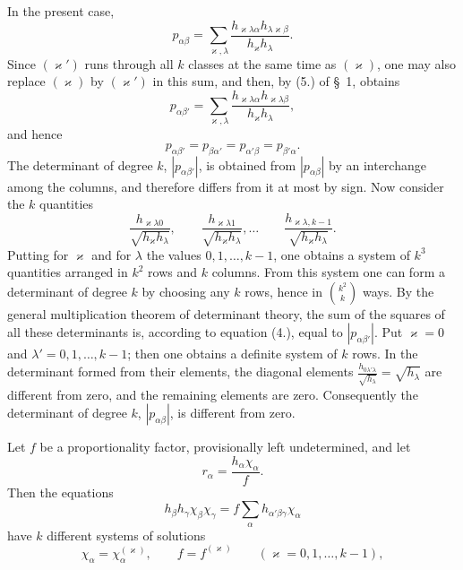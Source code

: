 \documentclass[11pt]{article}
\begin{document}
In the present case,
\[
p_{\alpha\beta}=\sum_{\varkappa,\lambda}\frac{h_{\varkappa\lambda\alpha}h_{\lambda\varkappa\beta}}{h_\varkappa h_\lambda}.
\]
Since $(\varkappa')$ runs through all $k$ classes at the same time as $(\varkappa)$, one may also replace $(\varkappa)$ by $(\varkappa')$ in this sum, and then, by (5.) of \S~1, obtains
\begin{equation*}\tag{4.}
p_{\alpha\beta'}=\sum_{\varkappa,\lambda}\frac{h_{\varkappa\lambda\alpha}h_{\varkappa\lambda\beta}}{h_\varkappa h_\lambda},
\end{equation*}
and hence
\begin{equation*}\tag{5.}
p_{\alpha\beta'}=p_{\beta\alpha'}=p_{\alpha'\beta}=p_{\beta'\alpha}.
\end{equation*}
The determinant of degree $k$, $|p_{\alpha\beta'}|$, is obtained from $|p_{\alpha\beta}|$ by an interchange among the columns, and therefore differs from it at most by sign. Now consider the $k$ quantities
\[
\frac{h_{\varkappa\lambda0}}{\sqrt{h_\varkappa h_\lambda}},\qquad
\frac{h_{\varkappa\lambda1}}{\sqrt{h_\varkappa h_\lambda}},\ldots\qquad
\frac{h_{\varkappa\lambda,k-1}}{\sqrt{h_\varkappa h_\lambda}}.
\]
Putting for $\varkappa$ and for $\lambda$ the values $0,1,\ldots,k-1$, one obtains a system of $k^3$ quantities arranged in $k^2$ rows and $k$ columns. From this system one can form a determinant of degree $k$ by choosing any $k$ rows, hence in $\binom{k^2}{k}$ ways. By the general multiplication theorem of determinant theory, the sum of the squares of all these determinants is, according to equation (4.), equal to $|p_{\alpha\beta'}|$. Put $\varkappa=0$ and $\lambda'=0,1,\ldots,k-1$; then one obtains a definite system of $k$ rows. In the determinant formed from their elements, the diagonal elements $\frac{h_{0\lambda'\lambda}}{\sqrt{h_\lambda}}=\sqrt{h_\lambda}$ are different from zero, and the remaining elements are zero. Consequently the determinant of degree $k$, $|p_{\alpha\beta}|$, is different from zero.

Let $f$ be a proportionality factor, provisionally left undetermined, and let
\[
r_\alpha=\frac{h_\alpha\chi_\alpha}{f}.
\]
Then the equations
\begin{equation*}\tag{6.}
h_\beta h_\gamma\chi_\beta\chi_\gamma=f\sum_\alpha h_{\alpha'\beta\gamma}\chi_\alpha
\end{equation*}
have $k$ different systems of solutions
\begin{equation*}\tag{7.}
\chi_\alpha=\chi_\alpha^{(\varkappa)},\qquad f=f^{(\varkappa)}\qquad(\varkappa=0,1,\ldots,k-1),
\end{equation*}
\end{document}
